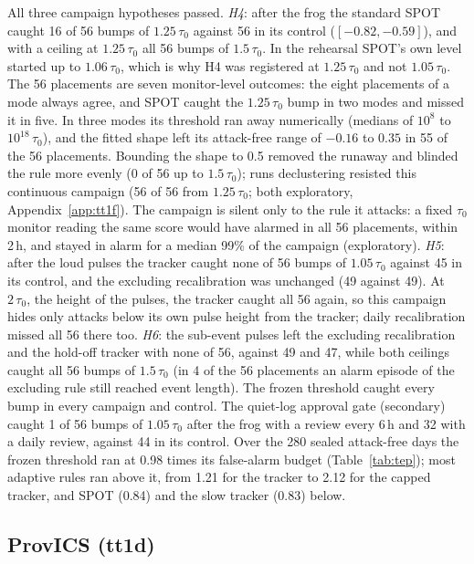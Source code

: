 \documentclass[sigconf,review,anonymous]{acmart}
\begin{document}
All three campaign hypotheses passed. \emph{H4}: after the frog the standard SPOT caught 16 of 56
bumps of $1.25\,\tau_0$ against 56 in its control ($[-0.82, -0.59]$), and with a ceiling at
$1.25\,\tau_0$ all 56 bumps of $1.5\,\tau_0$. In the rehearsal SPOT's own level started up to
$1.06\,\tau_0$, which is why H4 was registered at $1.25\,\tau_0$ and not $1.05\,\tau_0$. The 56 placements are
seven monitor-level outcomes: the eight placements of a mode always agree, and SPOT caught the
$1.25\,\tau_0$ bump in two modes and missed it in five. In three modes its threshold ran away
numerically (medians of $10^8$ to $10^{18}\,\tau_0$), and the fitted shape left its attack-free range of
$-0.16$ to $0.35$ in 55 of the 56 placements. Bounding the shape to 0.5 removed the runaway and blinded the rule
more evenly (0 of 56 up to $1.5\,\tau_0$); runs declustering resisted this continuous campaign (56 of
56 from $1.25\,\tau_0$; both exploratory, Appendix~\ref{app:tt1f}). The campaign is silent only to the
rule it attacks: a fixed $\tau_0$ monitor reading the same score would have alarmed in all 56
placements, within 2\,h, and stayed in alarm for a median 99\% of the campaign (exploratory). \emph{H5}:
after the loud pulses the tracker caught none of 56 bumps of $1.05\,\tau_0$ against 45 in its control,
and the excluding recalibration was unchanged (49 against 49). At $2\,\tau_0$, the height of the pulses,
the tracker caught all 56 again, so this campaign hides only attacks below its own pulse height from
the tracker; daily recalibration missed all 56 there too. \emph{H6}: the sub-event pulses left
the excluding recalibration and the hold-off tracker with none of 56, against 49 and 47, while both
ceilings caught all 56 bumps of $1.5\,\tau_0$ (in 4 of the 56 placements an alarm episode of the
excluding rule still reached event length). The frozen threshold caught every bump in every campaign
and control. The quiet-log approval gate (secondary) caught 1 of 56 bumps of $1.05\,\tau_0$ after the
frog with a review every 6\,h and 32 with a daily review, against 44 in its control. Over the 280
sealed attack-free days the frozen threshold ran at 0.98 times its false-alarm budget
(Table~\ref{tab:tep}); most adaptive rules ran above it, from 1.21 for the tracker to 2.12 for the
capped tracker, and SPOT (0.84) and the slow tracker (0.83) below.

\subsection{ProvICS (tt1d)}
\label{sec:provics}
\end{document}
